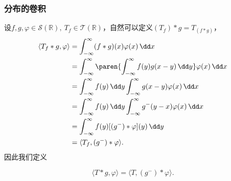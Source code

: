 \subsubsection{分布的卷积}

设$f,g,\varphi\in\mathcal{S}(\mathbb{R}),\ T_f\in\mathcal{T}(\mathbb{R})$，自然可以定义$(T_f)*g=T_{(f*g)}$，
\begin{align}
    \langle T_f*g,\varphi\rangle & =\int_{-\infty}^{\infty}(f*g)(x)\varphi(x)\,\dd x\nonumber                                           \\
                                 & =\int_{-\infty}^{\infty}\paren{\int_{-\infty}^{\infty}f(y)g(x-y)\,\dd y}\varphi(x)\,\dd x\nonumber \\
                                 & =\int_{-\infty}^{\infty}f(y)\,\dd y\int_{-\infty}^{\infty}g(x-y)\varphi(x)\,\dd x\nonumber              \\
                                 & =\int_{-\infty}^{\infty}f(y)\,\dd y\int_{-\infty}^{\infty}g^- (y-x)\varphi(x)\,\dd x\nonumber           \\
                                 & =\int_{-\infty}^{\infty}f(y)[(g^-) *\varphi](y)\,\dd y\nonumber                                      \\
                                 & =\langle T_f,(g^-)*\varphi\rangle.
\end{align}
因此我们定义
\begin{definition}[分布与函数的卷积]
    \begin{equation}
        \langle T*g,\varphi\rangle=\langle T,(g^-)*\varphi\rangle.
    \end{equation}
\end{definition}


